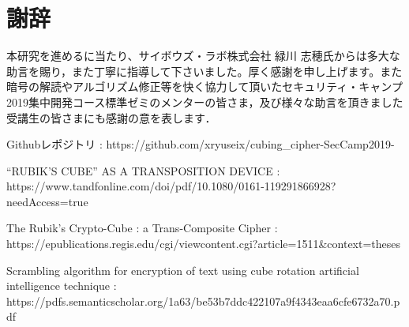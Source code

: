 \documentclass[a4p]{jarticle}
\begin{document}
\section{謝辞}
本研究を進めるに当たり、サイボウズ・ラボ株式会社 緑川 志穂氏からは多大な助言を賜り，また丁寧に指導して下さいました。厚く感謝を申し上げます。また暗号の解読やアルゴリズム修正等を快く協力して頂いたセキュリティ・キャンプ2019集中開発コース標準ゼミのメンターの皆さま，及び様々な助言を頂きました受講生の皆さまにも感謝の意を表します．

\newpage
\begin{flushleft}
\begin{thebibliography}{}

 Githubレポジトリ : https://github.com/xryuseix/cubing\_cipher-SecCamp2019-

 “RUBIK'S CUBE” AS A TRANSPOSITION DEVICE : https://www.tandfonline.com/doi/pdf/10.1080/0161-119291866928?needAccess=true

The Rubik's Crypto-Cube : a Trans-Composite Cipher : https://epublications.regis.edu/cgi/viewcontent.cgi?article=1511\&context=theses

Scrambling algorithm for encryption of text using cube rotation artificial intelligence technique : https://pdfs.semanticscholar.org/1a63/be53b7ddc422107a9f4343eaa6cfe6732a70.pdf

\end{thebibliography}
\end{flushleft}
\onecolumn 
\end{document}
